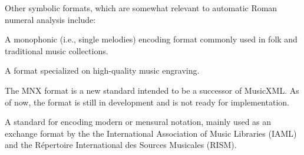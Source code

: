

Other symbolic formats, which are somewhat relevant to automatic Roman numeral analysis include:


A monophonic (i.e., single melodies) encoding format commonly used in folk and traditional music collections.


A format specialized on high-quality music engraving.



The MNX format is a new standard intended to be a successor of MusicXML. As of now, the format is still in development and is not ready for implementation.


A standard for encoding modern or mensural notation, mainly used as an exchange format by the the International Association of Music Libraries (IAML) and the R\'epertoire International des Sources Musicales (RISM).
